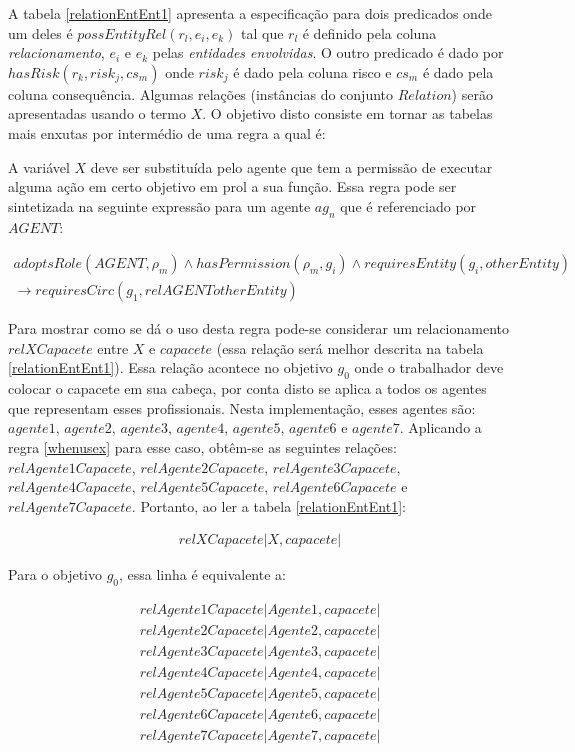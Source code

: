A tabela \ref{relationEntEnt1} apresenta a especificação para dois predicados onde um deles é $possEntityRel(r_l,e_i,e_k)$ tal que $r_l$ é definido pela coluna \textit{relacionamento}, $e_i$ e $e_k$ pelas \textit{entidades envolvidas}. 
O outro predicado é dado por $hasRisk(r_k,risk_j,cs_m)$ onde $risk_j$ é dado pela coluna risco e $cs_m$ é dado pela coluna consequência. 
Algumas relações (instâncias do conjunto $Relation$) serão apresentadas usando o termo $X$. O objetivo disto consiste em tornar as tabelas mais enxutas por intermédio de uma regra a qual é: 

A variável $X$ deve ser substituída pelo agente que tem a permissão de executar alguma ação em certo objetivo em prol a sua função. 
Essa regra pode ser sintetizada na seguinte expressão para um agente $ag_n$ que é referenciado por $AGENT$:

\begin{eqnarray}\label{whenusex} \nonumber
    adoptsRole(AGENT,\rho_m) \wedge hasPermission(\rho_m,g_i) \wedge  requiresEntity(g_i, otherEntity) \\ 
    \to requiresCirc(g_1, relAGENTotherEntity)  
\end{eqnarray}


Para mostrar como se dá o uso desta regra pode-se considerar um relacionamento $ relXCapacete$ entre $X$ e $capacete$ (essa relação será melhor descrita na tabela \ref{relationEntEnt1}). Essa relação acontece no objetivo $g_0$ onde o trabalhador deve colocar o capacete em sua cabeça, por conta disto se aplica a todos os agentes que representam esses profissionais. Nesta implementação, esses agentes são: $agente1$, $agente2$, $agente3$, $agente4$, $agente5$, $agente6$ e $agente7$. Aplicando a regra \ref{whenusex} para esse caso, obtêm-se as seguintes relações: $relAgente1Capacete$, $relAgente2Capacete$, $relAgente3Capacete$, $relAgente4Capacete$, $relAgente5Capacete$, $relAgente6Capacete$ e $relAgente7Capacete$. Portanto, ao ler a tabela \ref{relationEntEnt1}:  

\begin{eqnarray}
	relXCapacete | X,capacete |
\end{eqnarray}

Para o objetivo $g_0$, essa linha é equivalente a: 

\begin{eqnarray}
relAgente1Capacete | Agente1 ,capacete | \nonumber \\
relAgente2Capacete | Agente2 ,capacete | \nonumber \\ 
relAgente3Capacete | Agente3 ,capacete | \nonumber \\ 
relAgente4Capacete | Agente4 ,capacete | \nonumber \\
relAgente5Capacete | Agente5 ,capacete | \nonumber \\
relAgente6Capacete | Agente6 ,capacete | \nonumber \\
relAgente7Capacete | Agente7 ,capacete | \nonumber \\
\nonumber \\
\end{eqnarray}

